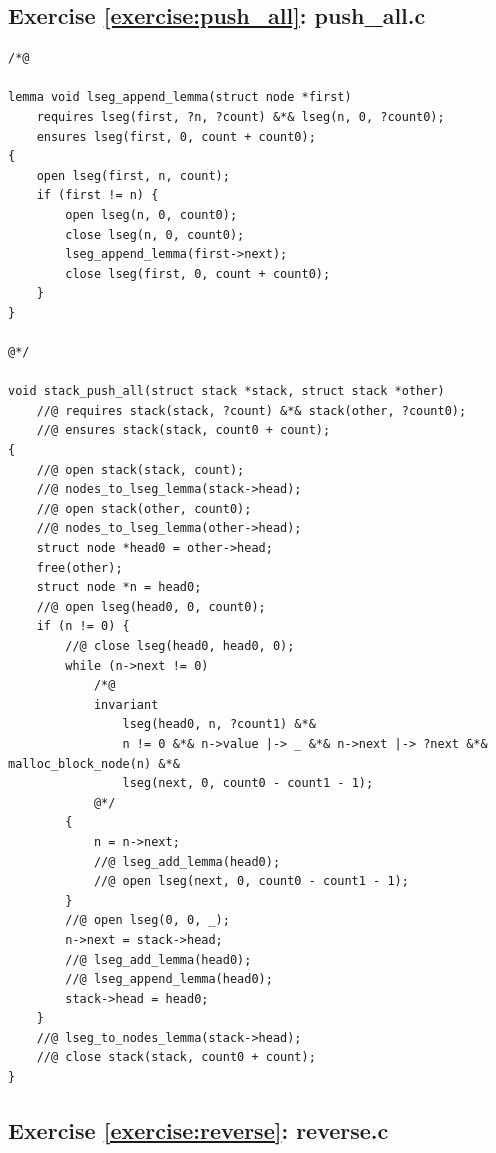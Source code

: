 \documentclass{article}
\begin{document}
\subsection{Exercise
\ref{exercise:push_all}: push\_all.c}\label{solution:push_all}

\begin{lstlisting}
/*@

lemma void lseg_append_lemma(struct node *first)
    requires lseg(first, ?n, ?count) &*& lseg(n, 0, ?count0);
    ensures lseg(first, 0, count + count0);
{
    open lseg(first, n, count);
    if (first != n) {
        open lseg(n, 0, count0);
        close lseg(n, 0, count0);
        lseg_append_lemma(first->next);
        close lseg(first, 0, count + count0);
    }
}

@*/

void stack_push_all(struct stack *stack, struct stack *other)
    //@ requires stack(stack, ?count) &*& stack(other, ?count0);
    //@ ensures stack(stack, count0 + count);
{
    //@ open stack(stack, count);
    //@ nodes_to_lseg_lemma(stack->head);
    //@ open stack(other, count0);
    //@ nodes_to_lseg_lemma(other->head);
    struct node *head0 = other->head;
    free(other);
    struct node *n = head0;
    //@ open lseg(head0, 0, count0);
    if (n != 0) {
        //@ close lseg(head0, head0, 0);
        while (n->next != 0)
            /*@
            invariant
                lseg(head0, n, ?count1) &*&
                n != 0 &*& n->value |-> _ &*& n->next |-> ?next &*& malloc_block_node(n) &*&
                lseg(next, 0, count0 - count1 - 1);
            @*/
        {
            n = n->next;
            //@ lseg_add_lemma(head0);
            //@ open lseg(next, 0, count0 - count1 - 1);
        }
        //@ open lseg(0, 0, _);
        n->next = stack->head;
        //@ lseg_add_lemma(head0);
        //@ lseg_append_lemma(head0);
        stack->head = head0;
    }
    //@ lseg_to_nodes_lemma(stack->head);
    //@ close stack(stack, count0 + count);
}
\end{lstlisting}

\subsection{Exercise
\ref{exercise:reverse}: reverse.c}\label{solution:reverse}
\end{document}
